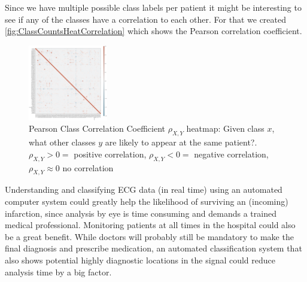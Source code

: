 Since we have multiple possible class labels per patient it might be interesting to see if any of the classes have a correlation to each other. For that we created \autoref{fig:ClassCountsHeatCorrelation} which shows the Pearson correlation coefficient.
\begin{figure}[H]
	\includegraphics[width=\textwidth]{bilder/ClassOccurencesCorrelation.png}
	\caption{Pearson Class Correlation Coefficient $\rho_{X,Y}$ heatmap: Given class $x$, what other classes $y$ are likely to appear at the same patient?. $\rho_{X,Y}>0=$ positive correlation, $\rho_{X,Y}<0=$ negative correlation, $\rho_{X,Y}\approx 0$ no correlation}
	\label{fig:ClassCountsHeatCorrelation}
\end{figure}


Understanding and classifying ECG data (in real time) using an automated computer system could greatly help the likelihood of surviving an (incoming) infarction, since analysis by eye is time consuming and demands a trained medical professional. Monitoring patients at all times in the hospital could also be a great benefit. While doctors will probably still be mandatory to make the final diagnosis and prescribe medication, an automated classification system that also shows potential highly diagnostic locations in the signal could reduce analysis time by a big factor.



